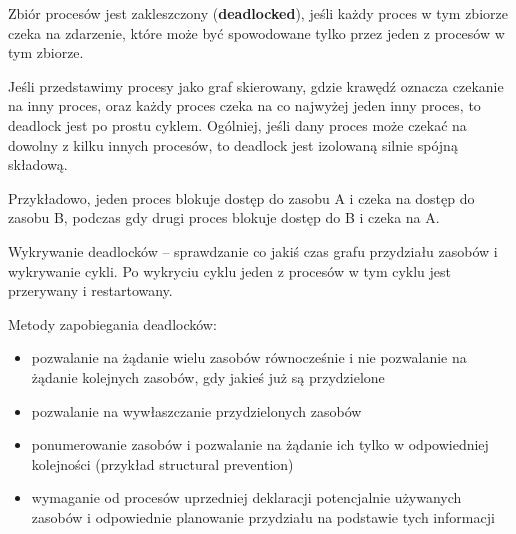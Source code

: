 Zbiór procesów jest zakleszczony (\textbf{deadlocked}), jeśli każdy proces w tym zbiorze czeka na zdarzenie, które może być spowodowane tylko przez jeden z procesów w tym zbiorze.

Jeśli przedstawimy procesy jako graf skierowany, gdzie krawędź oznacza czekanie na inny proces, oraz każdy proces czeka na co najwyżej jeden inny proces, to deadlock jest po prostu cyklem. Ogólniej, jeśli dany proces może czekać na dowolny z kilku innych procesów, to deadlock jest izolowaną silnie spójną składową.

Przykładowo, jeden proces blokuje dostęp do zasobu A i czeka na dostęp do zasobu B, podczas gdy drugi proces blokuje dostęp do B i czeka na A.

Wykrywanie deadlocków -- sprawdzanie co jakiś czas grafu przydziału zasobów i wykrywanie cykli. Po wykryciu cyklu jeden z procesów w tym cyklu jest przerywany i restartowany.

Metody zapobiegania deadlocków:
\begin{itemize}
    \item pozwalanie na żądanie wielu zasobów równocześnie i nie pozwalanie na żądanie kolejnych zasobów, gdy jakieś już są przydzielone
    \item pozwalanie na wywłaszczanie przydzielonych zasobów
    \item ponumerowanie zasobów i pozwalanie na żądanie ich tylko w odpowiedniej kolejności (przykład structural prevention)
    \item wymaganie od procesów uprzedniej deklaracji potencjalnie używanych zasobów i odpowiednie planowanie przydziału na podstawie tych informacji
\end{itemize}